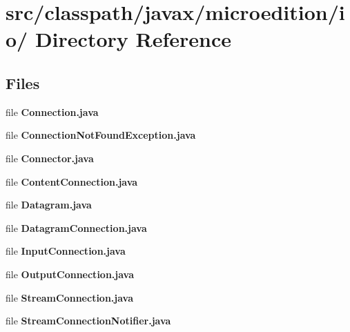 \section{src/classpath/javax/microedition/io/ Directory Reference}
\label{dir_16c677996be94206f46d5887917a9647}
\subsection*{Files}
\begin{DoxyCompactItemize}
\item 
file {\bfseries Connection.java}
\item 
file {\bfseries ConnectionNotFoundException.java}
\item 
file {\bfseries Connector.java}
\item 
file {\bfseries ContentConnection.java}
\item 
file {\bfseries Datagram.java}
\item 
file {\bfseries DatagramConnection.java}
\item 
file {\bfseries InputConnection.java}
\item 
file {\bfseries OutputConnection.java}
\item 
file {\bfseries StreamConnection.java}
\item 
file {\bfseries StreamConnectionNotifier.java}
\end{DoxyCompactItemize}
